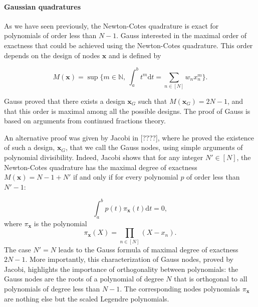 \documentclass[twoside,11pt]{article}
\begin{document}
\paragraph{Gaussian quadratures}
As we have seen previously, the Newton-Cotes quadrature is exact for polynomials of order less than $N-1$. Gauss interested in the maximal order of exactness that could be achieved using the Newton-Cotes quadrature. This order depends on the design of nodes $\bm{x}$ and is defined by 

\begin{equation}
M(\bm{x}) = \sup \{ m \in \mathbb{N}, \: \int_{a}^{b} t^{m} \mathrm{d}t = \sum\limits_{n \in [N]} w_{n}x_{n}^{m} \}.
\end{equation}





Gauss proved that there exists a design $\bm{x}_{G}$ such that $M(\bm{x}_{G}) = 2N-1$, and that this order is maximal among all the possible designs. The proof of Gauss is based on arguments from continued fractions theory.

An alternative proof was given by Jacobi in [????], where he proved the existence of such a design, $\bm{x}_{G}$, that we call the Gauss nodes, using simple arguments of polynomial divisibility. Indeed, Jacobi shows that for any integer $N' \in [N]$, the Newton-Cotes quadrature has the maximal degree of exactness $M(\bm{x}) = N-1+N'$ if and only if for every polynomial $p$ of order less than $N'-1$:

\begin{equation}
\int_{a}^{b} p(t) \pi_{\bm{x}}(t) \mathrm{d}t = 0,
\end{equation}
where $\pi_{\bm{x}}$ is the polynomial
\begin{equation}
\pi_{\bm{x}}(X) = \prod\limits_{n \in [N]}(X-x_{n}).
\end{equation}
The case $N' = N$ leads to the Gauss formula of maximal degree of exactness $2N-1$. More importantly, this characterization of Gauss nodes, proved by Jacobi, highlights the importance of orthogonality between polynomials: the Gauss nodes are the roots of a polynomial of degree $N$ that is orthogonal to all polynomials of degree less than $N-1$. The corresponding nodes polynomials $\pi_{\bm{x}}$ are nothing else but the scaled Legendre polynomials.
\end{document}
